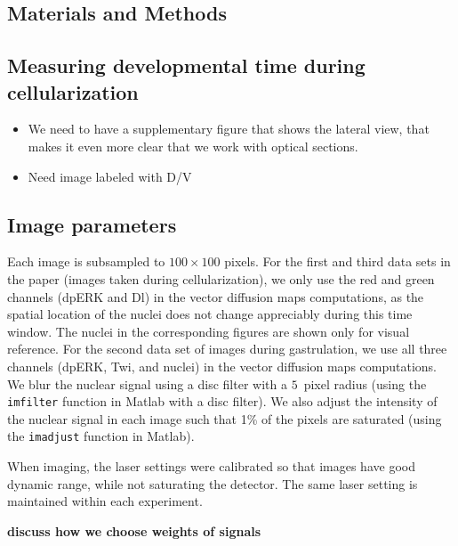 \documentclass{pnastwo}
\begin{document}
\begin{article}


\section{Materials and Methods}

\subsection{Measuring developmental time during cellularization}


\begin{itemize}
\item We need to have a supplementary figure that shows the lateral view, that makes it even more clear that we work with optical sections.

\item Need image labeled with D/V

\end{itemize}




\subsection{Image parameters}

Each image is subsampled to $100 \times 100$ pixels.
%
For the first and third data sets in the paper (images taken during cellularization), we only use the red and green channels (dpERK and Dl) in the vector diffusion maps computations, as the spatial location of the nuclei does not change appreciably during this time window.
%
The nuclei in the corresponding figures are shown only for visual reference.
%
For the second data set of images during gastrulation, we use all three channels (dpERK, Twi, and nuclei) in the vector diffusion maps computations.
%
We blur the nuclear signal using a disc filter with a $5$~pixel radius (using the \texttt{imfilter} function in Matlab with a disc filter).
%
We also adjust the intensity of the nuclear signal in each image such that 1\% of the pixels are saturated (using the \texttt{imadjust} function in Matlab).

When imaging, the laser settings were calibrated so that images have good dynamic range, while not saturating the detector. 
% 
The same laser setting is maintained within each experiment. 

{\bf discuss how we choose weights of signals}




\end{article}
\end{document}
